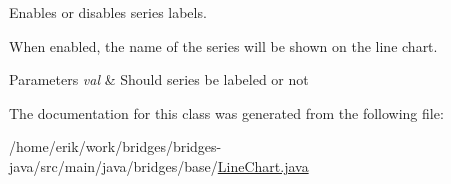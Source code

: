 Enables or disables series labels. 

When enabled, the name of the series will be shown on the line chart.


\begin{DoxyParams}{Parameters}
{\em val} & Should series be labeled or not \\
\hline
\end{DoxyParams}


The documentation for this class was generated from the following file\+:\begin{DoxyCompactItemize}
\item 
/home/erik/work/bridges/bridges-\/java/src/main/java/bridges/base/\hyperlink{_line_chart_8java}{Line\+Chart.\+java}\end{DoxyCompactItemize}
